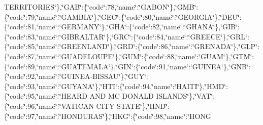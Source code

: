 {T\-E\-R\-R\-I\-T\-O\-R\-I\-E\-S\char`\"{}\},\char`\"{}G\-A\-B\char`\"{}\-:\{\char`\"{}code\char`\"{}\-:78,\char`\"{}name\char`\"{}\-:\char`\"{}G\-A\-B\-O\-N\char`\"{}\},\char`\"{}G\-M\-B\char`\"{}\-:\{\char`\"{}code\char`\"{}\-:79,\char`\"{}name\char`\"{}\-:\char`\"{}G\-A\-M\-B\-I\-A\char`\"{}\},\char`\"{}G\-E\-O\char`\"{}\-:\{\char`\"{}code\char`\"{}\-:80,\char`\"{}name\char`\"{}\-:\char`\"{}G\-E\-O\-R\-G\-I\-A\char`\"{}\},\char`\"{}D\-E\-U\char`\"{}\-:\{\char`\"{}code\char`\"{}\-:81,\char`\"{}name\char`\"{}\-:\char`\"{}G\-E\-R\-M\-A\-N\-Y\char`\"{}\},\char`\"{}G\-H\-A\char`\"{}\-:\{\char`\"{}code\char`\"{}\-:82,\char`\"{}name\char`\"{}\-:\char`\"{}G\-H\-A\-N\-A\char`\"{}\},\char`\"{}G\-I\-B\char`\"{}\-:\{\char`\"{}code\char`\"{}\-:83,\char`\"{}name\char`\"{}\-:\char`\"{}G\-I\-B\-R\-A\-L\-T\-A\-R\char`\"{}\},\char`\"{}G\-R\-C\char`\"{}\-:\{\char`\"{}code\char`\"{}\-:84,\char`\"{}name\char`\"{}\-:\char`\"{}G\-R\-E\-E\-C\-E\char`\"{}\},\char`\"{}G\-R\-L\char`\"{}\-:\{\char`\"{}code\char`\"{}\-:85,\char`\"{}name\char`\"{}\-:\char`\"{}G\-R\-E\-E\-N\-L\-A\-N\-D\char`\"{}\},\char`\"{}G\-R\-D\char`\"{}\-:\{\char`\"{}code\char`\"{}\-:86,\char`\"{}name\char`\"{}\-:\char`\"{}G\-R\-E\-N\-A\-D\-A\char`\"{}\},\char`\"{}G\-L\-P\char`\"{}\-:\{\char`\"{}code\char`\"{}\-:87,\char`\"{}name\char`\"{}\-:\char`\"{}G\-U\-A\-D\-E\-L\-O\-U\-P\-E\char`\"{}\},\char`\"{}G\-U\-M\char`\"{}\-:\{\char`\"{}code\char`\"{}\-:88,\char`\"{}name\char`\"{}\-:\char`\"{}G\-U\-A\-M\char`\"{}\},\char`\"{}G\-T\-M\char`\"{}\-:\{\char`\"{}code\char`\"{}\-:89,\char`\"{}name\char`\"{}\-:\char`\"{}G\-U\-A\-T\-E\-M\-A\-L\-A\char`\"{}\},\char`\"{}G\-I\-N\char`\"{}\-:\{\char`\"{}code\char`\"{}\-:91,\char`\"{}name\char`\"{}\-:\char`\"{}G\-U\-I\-N\-E\-A\char`\"{}\},\char`\"{}G\-N\-B\char`\"{}\-:\{\char`\"{}code\char`\"{}\-:92,\char`\"{}name\char`\"{}\-:\char`\"{}G\-U\-I\-N\-E\-A-\/B\-I\-S\-S\-A\-U\char`\"{}\},\char`\"{}G\-U\-Y\char`\"{}\-:\{\char`\"{}code\char`\"{}\-:93,\char`\"{}name\char`\"{}\-:\char`\"{}G\-U\-Y\-A\-N\-A\char`\"{}\},\char`\"{}H\-T\-I\char`\"{}\-:\{\char`\"{}code\char`\"{}\-:94,\char`\"{}name\char`\"{}\-:\char`\"{}H\-A\-I\-T\-I\char`\"{}\},\char`\"{}H\-M\-D\char`\"{}\-:\{\char`\"{}code\char`\"{}\-:95,\char`\"{}name\char`\"{}\-:\char`\"{}H\-E\-A\-R\-D A\-N\-D M\-C D\-O\-N\-A\-L\-D I\-S\-L\-A\-N\-D\-S\char`\"{}\},\char`\"{}V\-A\-T\char`\"{}\-:\{\char`\"{}code\char`\"{}\-:96,\char`\"{}name\char`\"{}\-:\char`\"{}V\-A\-T\-I\-C\-A\-N C\-I\-T\-Y S\-T\-A\-T\-E\char`\"{}\},\char`\"{}H\-N\-D\char`\"{}\-:\{\char`\"{}code\char`\"{}\-:97,\char`\"{}name\char`\"{}\-:\char`\"{}H\-O\-N\-D\-U\-R\-A\-S\char`\"{}\},\char`\"{}H\-K\-G\char`\"{}\-:\{\char`\"{}code\char`\"{}\-:98,\char`\"{}name\char`\"{}\-:\char`\"{}H\-O\-N\-G }
